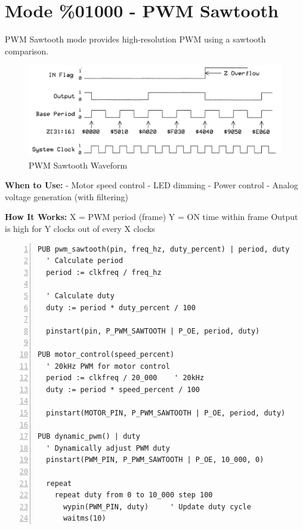 \documentclass[11pt,a4paper,oneside,english]{book}
\begin{document}
\clearpage

\hypertarget{mode-01000---pwm-sawtooth}{%
\section{Mode \%01000 - PWM Sawtooth}\label{mode-01000---pwm-sawtooth}}

PWM Sawtooth mode provides high-resolution PWM using a sawtooth
comparison.

\begin{figure}
\centering
\includegraphics{assets/P2 SmartPins-220809_page17_img01.png}
\caption{PWM Sawtooth Waveform}
\end{figure}

\textbf{When to Use:} - Motor speed control - LED dimming - Power
control - Analog voltage generation (with filtering)

\textbf{How It Works:} X = PWM period (frame) Y = ON time within frame
Output is high for Y clocks out of every X clocks

\begin{Spin2Block}
\begin{Verbatim}[numbers=left,numbersep=5pt,xleftmargin=15pt]
PUB pwm_sawtooth(pin, freq_hz, duty_percent) | period, duty
  ' Calculate period
  period := clkfreq / freq_hz
  
  ' Calculate duty
  duty := period * duty_percent / 100
  
  pinstart(pin, P_PWM_SAWTOOTH | P_OE, period, duty)

PUB motor_control(speed_percent)
  ' 20kHz PWM for motor control
  period := clkfreq / 20_000    ' 20kHz
  duty := period * speed_percent / 100
  
  pinstart(MOTOR_PIN, P_PWM_SAWTOOTH | P_OE, period, duty)
  
PUB dynamic_pwm() | duty
  ' Dynamically adjust PWM duty
  pinstart(PWM_PIN, P_PWM_SAWTOOTH | P_OE, 10_000, 0)
  
  repeat
    repeat duty from 0 to 10_000 step 100
      wypin(PWM_PIN, duty)     ' Update duty cycle
      waitms(10)
\end{Verbatim}
\end{Spin2Block}
\end{document}

